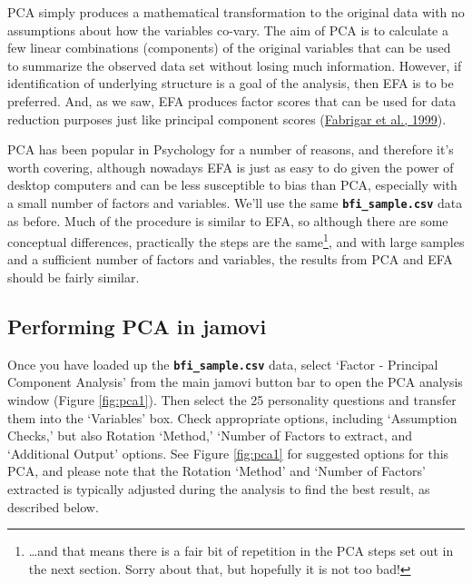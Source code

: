 \documentclass[
]{book}
\begin{document}
PCA simply produces a mathematical transformation to the original data with no assumptions about how the variables co-vary. The aim of PCA is to calculate a few linear combinations (components) of the original variables that can be used to summarize the observed data set without losing much information. However, if identification of underlying structure is a goal of the analysis, then EFA is to be preferred. And, as we saw, EFA produces factor scores that can be used for data reduction purposes just like principal component scores (\protect\hyperlink{ref-Fabrigar1999}{Fabrigar et al., 1999}).

PCA has been popular in Psychology for a number of reasons, and therefore it's worth covering, although nowadays EFA is just as easy to do given the power of desktop computers and can be less susceptible to bias than PCA, especially with a small number of factors and variables. We'll use the same \textbf{\texttt{bfi\_sample.csv}} data as before. Much of the procedure is similar to EFA, so although there are some conceptual differences, practically the steps are the same\footnote{\ldots and that means there is a fair bit of repetition in the PCA steps set out in the next section. Sorry about that, but hopefully it is not too bad!}, and with large samples and a sufficient number of factors and variables, the results from PCA and EFA should be fairly similar.

\hypertarget{performing-pca-in-jamovi}{%
\subsection{Performing PCA in jamovi}\label{performing-pca-in-jamovi}}

Once you have loaded up the \textbf{\texttt{bfi\_sample.csv}} data, select `Factor - Principal Component Analysis' from the main jamovi button bar to open the PCA analysis window (Figure \ref{fig:pca1}). Then select the 25 personality questions and transfer them into the `Variables' box. Check appropriate options, including `Assumption Checks,' but also Rotation `Method,' `Number of Factors to extract, and `Additional Output' options. See Figure \ref{fig:pca1} for suggested options for this PCA, and please note that the Rotation `Method' and `Number of Factors' extracted is typically adjusted during the analysis to find the best result, as described below.
\end{document}
